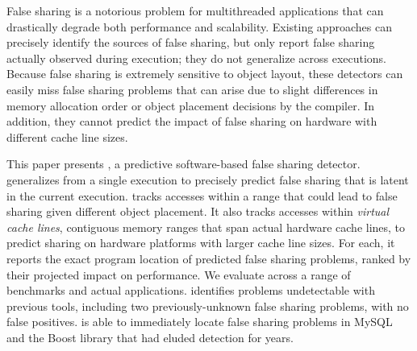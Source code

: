 False sharing is a notorious problem for multithreaded applications
that can drastically degrade both performance and
scalability. Existing approaches can precisely identify
the sources of false sharing, but only report false
sharing actually observed during execution; they do not generalize
across executions. Because false sharing is extremely sensitive to
object layout, these detectors can easily miss false sharing problems
that can arise due to slight differences in memory allocation order or
object placement decisions by the compiler. In addition, they cannot
predict the impact of false sharing on hardware with different cache
line sizes.

This paper presents \Predator{}, a predictive software-based false
sharing detector. \Predator{} generalizes from a single execution to
precisely predict false sharing that is latent in the current
execution. \predator{} tracks accesses within a range that could lead
to false sharing given different object placement. It also tracks
accesses within
\emph{virtual cache lines}, contiguous memory ranges that span actual
hardware cache lines, to predict sharing on hardware platforms with
larger cache line sizes. For each, it reports the exact program
location of predicted false sharing problems, ranked by their
projected impact on performance. We evaluate \Predator{} across a
range of benchmarks and actual applications. \Predator{} identifies
problems undetectable with previous tools, including two
previously-unknown false sharing problems, with no false
positives. \Predator{} is able to immediately locate false sharing problems in MySQL and the
Boost library that had eluded detection for years.
